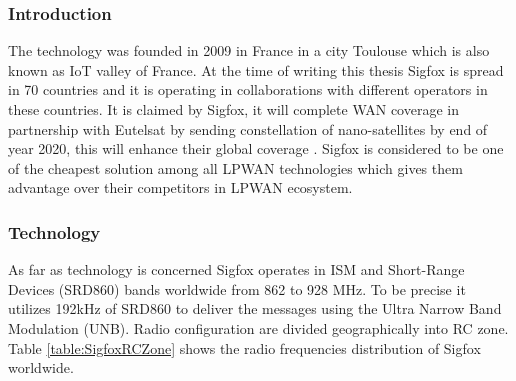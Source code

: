 \documentclass[12pt]{article}
\begin{document}
\subsubsection{Introduction}
The technology was founded in 2009 in France in a city Toulouse which is also known as IoT valley of France. At the time of writing this thesis Sigfox is spread in 70 countries \cite{SigfoxCoverage} and it is operating in collaborations with different operators in these countries. It is claimed by Sigfox, it will complete WAN coverage in partnership with Eutelsat by sending constellation of nano-satellites by end of year 2020, this will enhance their global coverage \cite{SigfoxSatellite}. Sigfox is considered to be one of the cheapest solution among all LPWAN technologies \cite{hernandez2017energy} which gives them advantage over their competitors in LPWAN ecosystem. 

 \subsubsection{Technology}
As far as technology is concerned Sigfox operates in ISM and Short-Range Devices (SRD860) bands worldwide from 862 to 928 MHz. To be precise it utilizes 192kHz of SRD860 to deliver the messages using the Ultra Narrow Band Modulation (UNB). Radio configuration are divided geographically into RC zone. Table \ref{table:SigfoxRCZone} shows the radio frequencies distribution of Sigfox worldwide.
\end{document}
